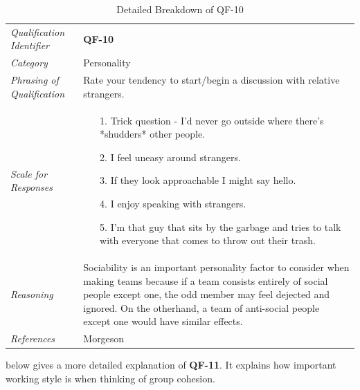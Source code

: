 \documentclass[12pt,letterpaper]{article}
\begin{document}
\begin{table}[H]
	\caption{Detailed Breakdown of QF-10}
	\begin{tabu} to 
		\toprule
		Qualification Identifier & {\bf QF-10}\\
		Category & Personality \\
		Phrasing of Qualification & Rate your tendency to start/begin a discussion with relative strangers. \\
		Scale for Responses &
		\begin{minipage}[t]{\linewidth}
			\begin{enumerate}
				\item[1.] Trick question - I'd never go outside where there's *shudders* other people.
				\item[2.] I feel uneasy around strangers.
				\item[3.] If they look approachable I might say hello.
				\item[4.] I enjoy speaking with strangers.
				\item[5.] I'm that guy that sits by the garbage and tries to talk with everyone that comes to throw out their trash.
			\end{enumerate}
		\end{minipage}\\
		Reasoning & Sociability is an important personality factor to consider when making teams because if a team consists entirely of social people except one, the odd member may feel dejected and ignored. On the otherhand, a team of anti-social people except one would have similar effects.\\
		References & Morgeson\cite{morgeson}\\
		\toprule
	\end{tabu}
\end{table}

\newpage{}

 below gives a more detailed explanation of {\bf QF-11}. It explains how important working style is when thinking of group cohesion.
\end{document}

